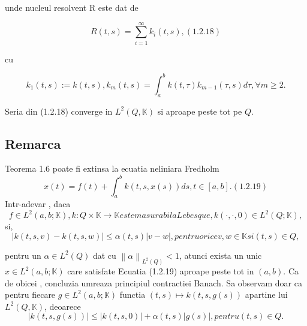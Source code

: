 \documentclass[a4paper,12pt,oneside]{report}
\begin{document}
	unde nucleul resolvent R este dat de 
					
	\begin{displaymath}
		R\left ( t,s \right ) = \sum_{i=1}^{\infty }k_{i}\left ( t,s \right ), (1.2.18)
	\end{displaymath}
					
	cu
					
	\begin{displaymath}
		k_{1}\left ( t,s \right ):= k\left ( t,s \right ), k_{m}\left ( t,s \right ) = \int_{a}^{b}k\left ( t,\tau  \right )k_{m -1}\left ( \tau ,s \right )d\tau , \forall m\geq 2. 
	\end{displaymath}
					
	Seria din (1.2.18) converge in \(L^{2}\left ( Q,\mathbb{K} \right )\) si aproape peste tot pe \(Q\). 
					
	\subsection{Remarca}
					
	Teorema 1.6 poate fi extinsa la ecuatia neliniara Fredholm 
	\begin{displaymath}
		x\left ( t \right ) = f\left ( t \right ) + \int_{a}^{b}k\left ( t,s,x\left ( s \right ) \right )ds, t\in \left [ a,b \right ]. (1.2.19)
	\end{displaymath}
	Intr-adevar , daca \begin{displaymath}
	f\in L^{2}\left ( a,b;\mathbb{K} \right ), k:Q\times \mathbb{K}\rightarrow \mathbb{K} este masurabila Lebesque,  k\left ( \cdot ,\cdot ,0 \right )\in L^{2}\left ( Q; \mathbb{K} \right ) ,
	\end{displaymath}
	si, 
	\begin{displaymath}
		\left | k\left ( t,s,v \right ) - k\left ( t,s,w \right ) \right |\leq \alpha \left ( t,s \right )\left | v - w \right |, pentru orice v,w \in \mathbb{K} si \left ( t,s \right ) \in Q,
	\end{displaymath}
					
	pentru un \(\alpha \in L^{2}\left ( Q \right )\) dat cu \(\left \| \alpha  \right \|_{L^{2}\left ( Q \right )} < 1\), atunci exista un unic \(x\in L^{2}\left ( a,b; \mathbb{K} \right )\) care satisfate Ecuatia (1.2.19) aproape peste tot in \(\left (a,b  \right )\). Ca de obicei , concluzia umreaza principiul contractiei Banach. Sa observam doar ca pentru fiecare \(g\in L^{2}\left ( a,b; \mathbb{K} \right )\) functia \(\left (t,s  \right )  \mapsto k\left ( t,s,g\left ( s \right ) \right )\) apartine lui \(L^{2}\left ( Q, \mathbb{K} \right )\), deoarece 
	\begin{displaymath}
		\left | k\left ( t,s,g\left ( s \right ) \right ) \right | \leq \left | k\left ( t,s,0 \right ) \right | + \alpha \left ( t,s \right )\left | g\left ( s \right ) \right |, pentru \left ( t,s \right )\in Q.
	\end{displaymath}
					
\end{document}
